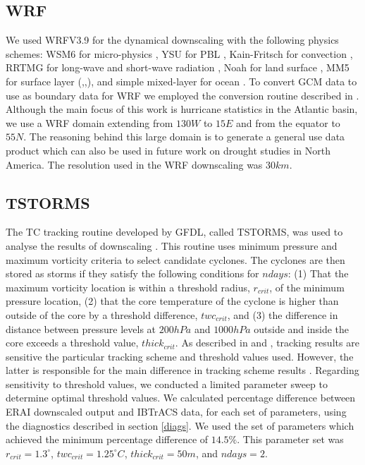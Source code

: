\subsection{WRF}
\label{WRF}
We used WRFV3.9 for the dynamical downscaling with the following physics schemes: WSM6 for micro-physics \cite{mp_phys}, YSU for PBL \cite{pbl_phys}, Kain-Fritsch for convection \cite{cu_phys}, RRTMG for long-wave and short-wave radiation \cite{rad_phys}, Noah for land surface \cite{sfc_phys}, MM5 for surface layer (\cite{sfclay_phys:1},\cite{sfclay_phys:2},\cite{sfclay_phys:3}), and simple mixed-layer for ocean \cite{ocn_phys}. To convert GCM data to use as boundary data for WRF we employed the conversion routine described in \cite{tech_notes}. Although the main focus of this work is hurricane statistics in the Atlantic basin, we use a WRF domain extending from $130W$ to $15E$ and from the equator to $55N$. The reasoning behind this large domain is to generate a general use data product which can also be used in future work on drought studies in North America. The resolution used in the WRF downscaling was $30km$.    


\subsection{TSTORMS}
\label{tstorms}
The TC tracking routine developed by GFDL, called TSTORMS, was used to analyse the results of downscaling \cite{tc_algo}. This routine uses minimum pressure and maximum vorticity criteria to select candidate cyclones. The cyclones are then stored as storms if they satisfy the following conditions for $ndays$: (1) That the maximum vorticity location is within a threshold radius, $r_{crit}$, of the minimum pressure location, (2) that the core temperature of the cyclone is higher than outside of the core by a threshold difference, $twc_{crit}$, and (3) the difference in distance between pressure levels at $200hPa$ and $1000hPa$ outside and inside the core exceeds a threshold value, $thick_{crit}$. As described in \cite{kerry_clivar} and \cite{tc_algo}, tracking results are sensitive the particular tracking scheme and threshold values used. However, the latter is responsible for the main difference in tracking scheme results \cite{tc_track}. Regarding sensitivity to threshold values, we conducted a limited parameter sweep to determine optimal threshold values. We calculated percentage difference between ERAI downscaled output and IBTrACS data, for each set of parameters, using the diagnostics described in section \ref{diags}. We used the set of parameters which achieved the minimum percentage difference of $14.5\%$. This parameter set was $r_{crit} = 1.3^{\circ}$, $twc_{crit} = 1.25^{\circ}C$, $thick_{crit} = 50m$, and $ndays = 2$.  

